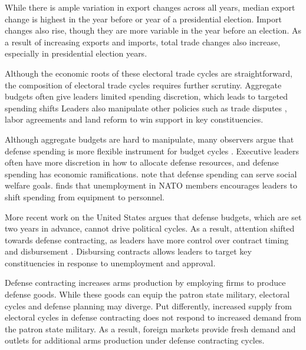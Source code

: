 \documentclass[12pt]{article}
\begin{document}
While there is ample variation in export changes across all years, median export change is highest in the year before or year of a presidential election.
Import changes also rise, though they are more variable in the year before an election. 
As a result of increasing exports and imports, total trade changes also increase, especially in presidential election years.


Although the economic roots of these electoral trade cycles are straightforward, the composition of electoral trade cycles requires further scrutiny.
Aggregate budgets often give leaders limited spending discretion, which leads to targeted spending shifts \citep[pg. 248]{Dubois2016}
Leaders also manipulate other policies such as trade disputes \citep{Conconietal2017}, labor agreements \citep{Ahlquist2010} and land reform \cite{Philips2020} to win support in key constituencies.


Although aggregate budgets are hard to manipulate, many observers argue that defense spending is more flexible instrument for budget cycles \citep{Tufte1978, Mintz1988}.
Executive leaders often have more discretion in how to allocate defense resources, and defense spending has economic ramifications.
\citet{WhittenWilliams2011} note that defense spending can serve social welfare goals. 
\citet{Becker2021} finds that unemployment in NATO members encourages leaders to shift spending from equipment to personnel.


More recent work on the United States argues that defense budgets, which are set two years in advance, cannot drive political cycles.
As a result, attention shifted towards defense contracting, as leaders have more control over contract timing and disbursement \citep{Mayer1995, DerouenHeo2000}.
Disbursing contracts allows leaders to target key constituencies in response to unemployment and approval.


Defense contracting increases arms production by employing firms to produce defense goods. 
While these goods can equip the patron state military, electoral cycles and defense planning may diverge.
Put differently, increased supply from electoral cycles in defense contracting does not respond to increased demand from the patron state military. 
As a result, foreign markets provide fresh demand and outlets for additional arms production under defense contracting cycles. 
\end{document}
